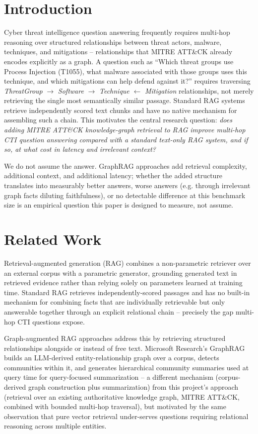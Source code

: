 \documentclass[conference]{IEEEtran}
\begin{document}
\section{Introduction}
Cyber threat intelligence question answering frequently requires multi-hop
reasoning over structured relationships between threat actors, malware,
techniques, and mitigations -- relationships that MITRE ATT\&CK already
encodes explicitly as a graph. A question such as ``Which threat groups use
Process Injection (T1055), what malware associated with those groups uses
this technique, and which mitigations can help defend against it?'' requires
traversing \emph{ThreatGroup} $\rightarrow$ \emph{Software}
$\rightarrow$ \emph{Technique} $\leftarrow$ \emph{Mitigation} relationships,
not merely retrieving the single most semantically similar passage.
Standard RAG systems retrieve independently scored text chunks and have no
native mechanism for assembling such a chain. This motivates the central
research question: \emph{does adding MITRE ATT\&CK knowledge-graph
retrieval to RAG improve multi-hop CTI question answering compared with a
standard text-only RAG system, and if so, at what cost in latency and
irrelevant context?}

We do not assume the answer. GraphRAG approaches add retrieval complexity,
additional context, and additional latency; whether the added structure
translates into measurably better answers, worse answers (e.g. through
irrelevant graph facts diluting faithfulness), or no detectable difference
at this benchmark size is an empirical question this paper is designed to
measure, not assume.

\section{Related Work}
Retrieval-augmented generation (RAG) \cite{lewis2020} combines a
non-parametric retriever over an external corpus with a parametric
generator, grounding generated text in retrieved evidence rather than
relying solely on parameters learned at training time. Standard RAG
retrieves independently-scored passages and has no built-in mechanism for
combining facts that are individually retrievable but only answerable
together through an explicit relational chain -- precisely the gap
multi-hop CTI questions expose.

Graph-augmented RAG approaches address this by retrieving structured
relationships alongside or instead of free text. Microsoft Research's
GraphRAG \cite{edge2024graphrag} builds an LLM-derived entity-relationship
graph over a corpus, detects communities within it, and generates
hierarchical community summaries used at query time for
query-focused summarization -- a different mechanism (corpus-derived graph
construction plus summarization) from this project's approach (retrieval
over an existing authoritative knowledge graph, MITRE ATT\&CK, combined
with bounded multi-hop traversal), but motivated by the same observation
that pure vector retrieval under-serves questions requiring relational
reasoning across multiple entities.
\end{document}
